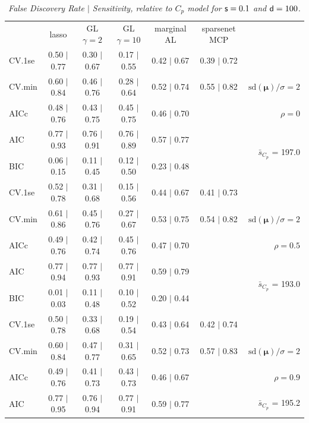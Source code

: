 \documentclass[12pt]{article}
\newcommand{\mr}[1]{\mathrm{#1}}
\newcommand{\bm}[1]{\mathbf{#1}}
\begin{document}
\begin{table}[p]\vspace{-.5cm}
\caption[l]{\it False Discovery Rate $\mid$ Sensitivity, relative to $C_p$ model  for ${\sf s}=0.1$ and ${\sf d}=100$.}
\vspace{-.5cm}
\small{}
\begin{center}
\begin{tabular}{l*{5}{c}|r}
 & lasso & GL $\gamma=2$ & GL $\gamma=10$ & marginal AL & sparsenet MCP  & \\
 \cline{1-7}
CV.1se & 0.50 $\mid$ 0.77 & 0.30 $\mid$ 0.67 & 0.17 $\mid$ 0.55 & 0.42 $\mid$ 0.67 & 0.39 $\mid$ 0.72 &\\
CV.min & 0.60 $\mid$ 0.84 & 0.46 $\mid$ 0.76 & 0.28 $\mid$ 0.64 & 0.52 $\mid$ 0.74 & 0.55 $\mid$ 0.82 &  $\mr{sd}(\bm{\mu})/\sigma=2$ \\
AICc & 0.48 $\mid$ 0.76 & 0.43 $\mid$ 0.75 & 0.45 $\mid$ 0.75 & 0.46 $\mid$ 0.70 & & $\rho=0$ \\
AIC & 0.77 $\mid$ 0.93 & 0.76 $\mid$ 0.91 & 0.76 $\mid$ 0.89 & 0.57 $\mid$ 0.77 & & \multirow{2}{*}{$\bar{s}_{C_p}$ = 197.0} \\
BIC & 0.06 $\mid$ 0.15 & 0.11 $\mid$ 0.45 & 0.12 $\mid$ 0.50 & 0.23 $\mid$ 0.48 & & \\
 \hline 
CV.1se & 0.52 $\mid$ 0.78 & 0.31 $\mid$ 0.68 & 0.15 $\mid$ 0.56 & 0.44 $\mid$ 0.67 & 0.41 $\mid$ 0.73 &\\
CV.min & 0.61 $\mid$ 0.86 & 0.45 $\mid$ 0.76 & 0.27 $\mid$ 0.67 & 0.53 $\mid$ 0.75 & 0.54 $\mid$ 0.82 &  $\mr{sd}(\bm{\mu})/\sigma=2$ \\
AICc & 0.49 $\mid$ 0.76 & 0.42 $\mid$ 0.74 & 0.45 $\mid$ 0.76 & 0.47 $\mid$ 0.70 & & $\rho=0.5$ \\
AIC & 0.77 $\mid$ 0.94 & 0.77 $\mid$ 0.93 & 0.77 $\mid$ 0.91 & 0.59 $\mid$ 0.79 & & \multirow{2}{*}{$\bar{s}_{C_p}$ = 193.0} \\
BIC & 0.01 $\mid$ 0.03 & 0.11 $\mid$ 0.48 & 0.10 $\mid$ 0.52 & 0.20 $\mid$ 0.44 & & \\
 \hline 
CV.1se & 0.50 $\mid$ 0.78 & 0.33 $\mid$ 0.68 & 0.19 $\mid$ 0.54 & 0.43 $\mid$ 0.64 & 0.42 $\mid$ 0.74 &\\
CV.min & 0.60 $\mid$ 0.84 & 0.47 $\mid$ 0.77 & 0.31 $\mid$ 0.65 & 0.52 $\mid$ 0.73 & 0.57 $\mid$ 0.83 &  $\mr{sd}(\bm{\mu})/\sigma=2$ \\
AICc & 0.49 $\mid$ 0.76 & 0.41 $\mid$ 0.73 & 0.43 $\mid$ 0.73 & 0.46 $\mid$ 0.67 & & $\rho=0.9$ \\
AIC & 0.77 $\mid$ 0.95 & 0.76 $\mid$ 0.94 & 0.77 $\mid$ 0.91 & 0.59 $\mid$ 0.77 & & \multirow{2}{*}{$\bar{s}_{C_p}$ = 195.2} \\

\end{tabular}
\end{center}
\end{table}
\end{document}
